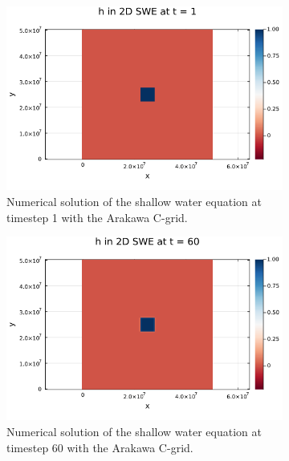 \begin{figure}[h]
    \begin{subfigure}[b]{0.3\textwidth}
        \includegraphics[width=\textwidth]{./images/swe2d-no-coriolis-1.png}
        \caption{Numerical solution of the shallow water equation at timestep 1 with the Arakawa C-grid.}
        \label{fig:nocoriolis1}
    \end{subfigure}
    \hfill
    \begin{subfigure}[b]{0.3\textwidth}
        \includegraphics[width=\textwidth]{./images/swe2d-no-coriolis-60.png}
        \caption{Numerical solution of the shallow water equation at timestep 60 with the Arakawa C-grid.}
        \label{fig:nocoriolis60}
    \end{subfigure}
    \hfill
    \begin{subfigure}[b]{0.3\textwidth}

\end{subfigure}
\end{figure}
